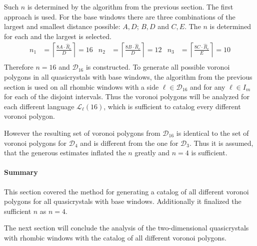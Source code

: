 \documentclass[text.tex]{subfiles}
\begin{document}
Such $n$ is determined by the algorithm from the previous section. The first approach is used. For the base windows there are three combinations of the largest and smallest distance possible: $A,D$; $B,D$ and $C,E$. The $n$ is determined for each and the largest is selected. 
\begin{align*}
n_1 &= \left\lceil\frac{8A\cdot\hat{R}_c}{D}\right\rceil = 16 & n_2 &= \left\lceil\frac{8B\cdot\hat{R}_c}{D}\right\rceil = 12 & n_3 &= \left\lceil\frac{8C\cdot\hat{R}_c}{E}\right\rceil = 10\\
\end{align*}
Therefore $n=16$ and $\mathcal{D}_{16}$ is constructed. To generate all possible voronoi polygons in all quasicrystals with base windows, the algorithm from the previous section is used on all rhombic windows with a side $\ell\in\mathcal{D}_{16}$ and for any $\ell\in I_m$ for each of the disjoint intervals. Thus the voronoi polygons will be analyzed for each different language $\mathcal{L}_\ell(16)$, which is sufficient to catalog every different voronoi polygon. 

However the resulting set of voronoi polygons from $\mathcal{D}_{16}$ is identical to the set of voronoi polygons for $\mathcal{D}_4$ and is different from the one for $\mathcal{D}_3$. Thus it is assumed, that the generous estimates inflated the $n$ greatly and $n=4$ is sufficient.

\paragraph{Summary} This section covered the method for generating a catalog of all different voronoi polygons for all quasicrystals with base windows. Additionally it finalized the sufficient $n$ as $n=4$.

The next section will conclude the analysis of the two-dimensional quasicrystals with rhombic windows with the catalog of all different voronoi polygons.

\clearpage
\end{document}
